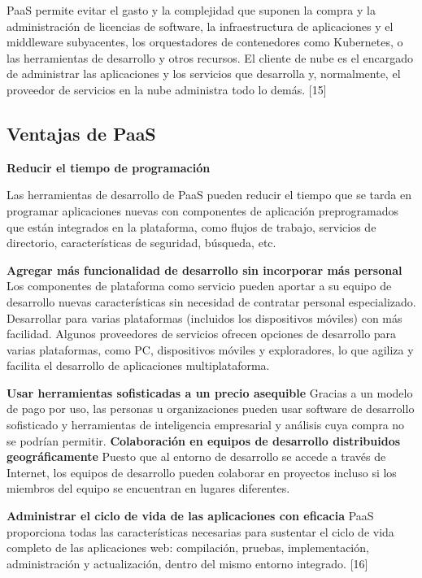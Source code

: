 PaaS permite evitar el gasto y la complejidad que suponen la compra y la administración de licencias de software, la infraestructura de aplicaciones y el middleware subyacentes, los orquestadores de contenedores como Kubernetes, o las herramientas de desarrollo y otros recursos. 
El cliente de nube es el encargado de administrar las aplicaciones y los servicios que desarrolla y, normalmente, el proveedor de servicios en la nube administra todo lo demás. [15]

\subsection{Ventajas de PaaS }

\textbf{Reducir el tiempo de programación}

 Las herramientas de desarrollo de PaaS pueden reducir el tiempo que se tarda en programar aplicaciones nuevas con componentes de aplicación preprogramados que están integrados en la plataforma, como flujos de trabajo, servicios de directorio, características de seguridad, búsqueda, etc. 
 
 \textbf{Agregar más funcionalidad de desarrollo sin incorporar más personal}
  Los componentes de plataforma como servicio pueden aportar a su equipo de desarrollo nuevas características sin necesidad de contratar personal especializado. 
 Desarrollar para varias plataformas (incluidos los dispositivos móviles) con más facilidad. Algunos proveedores de servicios ofrecen opciones de desarrollo para varias plataformas, como PC, dispositivos móviles y exploradores, lo que agiliza y facilita el desarrollo de aplicaciones multiplataforma. 
 
 \textbf{Usar herramientas sofisticadas a un precio asequible}
  Gracias a un modelo de pago por uso, las personas u organizaciones pueden usar software de desarrollo sofisticado y herramientas de inteligencia empresarial y análisis cuya compra no se podrían permitir. 
\textbf{  Colaboración en equipos de desarrollo distribuidos geográficamente}
  Puesto que al entorno de desarrollo se accede a través de Internet, los equipos de desarrollo pueden colaborar en proyectos incluso si los miembros del equipo se encuentran en lugares diferentes. 

 \textbf{Administrar el ciclo de vida de las aplicaciones con eficacia}
  PaaS proporciona todas las características necesarias para sustentar el ciclo de vida completo de las aplicaciones web: compilación, pruebas, implementación, administración y actualización, dentro del mismo entorno integrado. [16]
 
